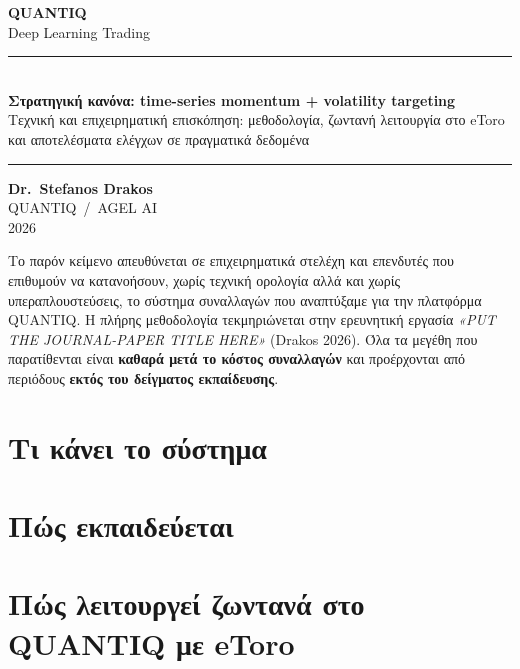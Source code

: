 \documentclass[11pt]{article}
\newcommand{\modeltitle}{Στρατηγική κανόνα: time-series momentum + volatility targeting}
\newcommand{\modelsubtitle}{Τεχνική και επιχειρηματική επισκόπηση: μεθοδολογία, ζωντανή λειτουργία στο eToro και αποτελέσματα ελέγχων σε πραγματικά δεδομένα}
\newcommand{\papertitle}{\emph{«PUT THE JOURNAL-PAPER TITLE HERE»} (Drakos 2026)}
\newcommand{\reportdate}{2026}
\begin{document}
\begin{titlepage}\centering\thispagestyle{empty}
\vspace*{3.2cm}
{\sffamily\bfseries\fontsize{52}{56}\selectfont QUANTIQ}\\[14pt]
{\sffamily\fontsize{22}{26}\selectfont\color{accent} Deep Learning Trading}\\[3.4cm]
\rule{0.66\linewidth}{0.4pt}\\[18pt]
{\large\bfseries \modeltitle}\\[8pt]
{\normalsize \modelsubtitle}\\[14pt]
\rule{0.66\linewidth}{0.4pt}
\vfill
{\large\bfseries Dr.\ Stefanos Drakos}\\[5pt]
{\normalsize QUANTIQ \,/\, AGEL AI}\\[3pt]
{\small \reportdate}
\end{titlepage}

\noindent
Το παρόν κείμενο απευθύνεται σε επιχειρηματικά στελέχη και επενδυτές που επιθυμούν να κατανοήσουν,
χωρίς τεχνική ορολογία αλλά και χωρίς υπεραπλουστεύσεις, το σύστημα συναλλαγών που αναπτύξαμε για την
πλατφόρμα QUANTIQ. %
Η πλήρης μεθοδολογία τεκμηριώνεται στην ερευνητική εργασία \papertitle. Όλα τα μεγέθη που
παρατίθενται είναι \textbf{καθαρά μετά το κόστος συναλλαγών} και προέρχονται από περιόδους
\textbf{εκτός του δείγματος εκπαίδευσης}.

\section{Τι κάνει το σύστημα}

\section{Πώς εκπαιδεύεται}

\section{Πώς λειτουργεί ζωντανά στο QUANTIQ με eToro}
\end{document}
